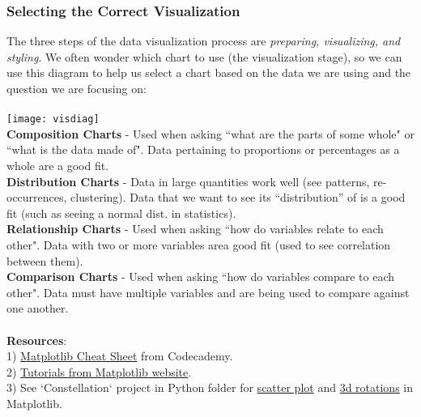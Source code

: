 \documentclass[11pt, a4paper]{article}
\begin{document}
\begin{spacing}{1.1}
	\subsubsection{Selecting the Correct Visualization}
	The three steps of the data visualization process are \textit{preparing, visualizing, and styling}. We often wonder which chart to use (the visualization stage), so we can use this diagram to help us select a chart based on the data we are using and the question we are focusing on: \\~\\
	\texttt{[image: visdiag]} \\
	\textbf{Composition Charts} - Used when asking ``what are the parts of some whole" or ``what is the data made of". Data pertaining to proportions or percentages as a whole are a good fit. \vspace*{2mm} \\
	\textbf{Distribution Charts} - Data in large quantities work well (see patterns, re-occurrences, clustering). Data that we want to see its ``distribution'' of is a good fit (such as seeing a normal dist. in statistics). \vspace*{2mm} \\
	\textbf{Relationship Charts} - Used when asking ``how do variables relate to each other". Data with two or more variables area good fit (used to see correlation between them). \vspace*{2mm} \\
	\textbf{Comparison Charts} - Used when asking ``how do variables compare to each other". Data must have multiple variables and are being used to compare against one another. \\~\\
	\textbf{Resources}: \\
	1) \href{https://s3.amazonaws.com/codecademy-content/courses/matplotlib/data_vis_matplotlib_cheatsheet_v1_revisons.pdf}{Matplotlib Cheat Sheet} from Codecademy. \\
	2) \href{https://matplotlib.org/tutorials/index.html}{Tutorials from Matplotlib website}. \\
	3) See `Constellation` project in Python folder for \underline{scatter plot} and \underline{3d rotations} in Matplotlib. \newpage

\end{spacing}
\end{document}
